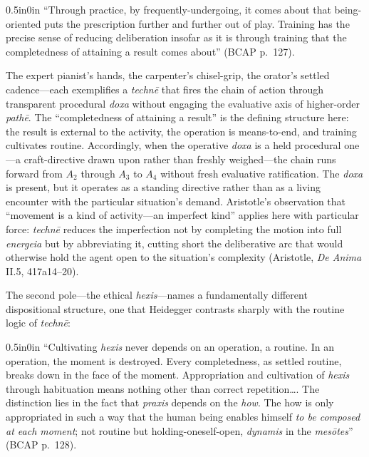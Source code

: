 \documentclass{article}
\begin{document}
\begin{adjustwidth}{0.5in}{0in}
``Through practice, by frequently-undergoing, it comes about that being-oriented puts the prescription further and further out of play. Training has the precise sense of reducing deliberation insofar as it is through training that the completedness of attaining a result comes about'' (BCAP p.~127).
\end{adjustwidth}

The expert pianist's hands, the carpenter's chisel-grip, the orator's settled cadence---each exemplifies a \textit{technē} that fires the chain of action through transparent procedural \textit{doxa} without engaging the evaluative axis of higher-order \textit{pathē}. The ``completedness of attaining a result'' is the defining structure here: the result is external to the activity, the operation is means-to-end, and training cultivates routine. Accordingly, when the operative \textit{doxa} is a held procedural one---a craft-directive drawn upon rather than freshly weighed---the chain runs forward from $A_2$ through $A_3$ to $A_4$ without fresh evaluative ratification. The \textit{doxa} is present, but it operates as a standing directive rather than as a living encounter with the particular situation's demand. Aristotle's observation that ``movement is a kind of activity---an imperfect kind'' applies here with particular force: \textit{technē} reduces the imperfection not by completing the motion into full \textit{energeia} but by abbreviating it, cutting short the deliberative arc that would otherwise hold the agent open to the situation's complexity (Aristotle, \textit{De Anima} II.5, 417a14--20).

The second pole---the ethical \textit{hexis}---names a fundamentally different dispositional structure, one that Heidegger contrasts sharply with the routine logic of \textit{technē}:

\begin{adjustwidth}{0.5in}{0in}
``Cultivating \textit{hexis} never depends on an operation, a routine. In an operation, the moment is destroyed. Every completedness, as settled routine, breaks down in the face of the moment. Appropriation and cultivation of \textit{hexis} through habituation means nothing other than correct repetition\ldots. The distinction lies in the fact that \textit{praxis} depends on the \textit{how}. The how is only appropriated in such a way that the human being enables himself \textit{to be composed at each moment}; not routine but holding-oneself-open, \textit{dynamis} in the \textit{mesōtes}'' (BCAP p.~128).
\end{adjustwidth}
\end{document}
